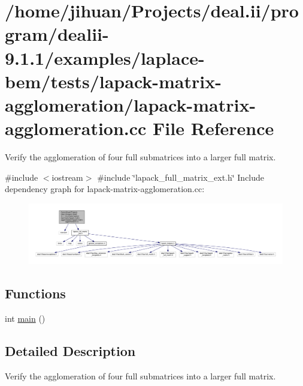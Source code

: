 \hypertarget{lapack-matrix-agglomeration_8cc}{}\section{/home/jihuan/\+Projects/deal.ii/program/dealii-\/9.1.1/examples/laplace-\/bem/tests/lapack-\/matrix-\/agglomeration/lapack-\/matrix-\/agglomeration.cc File Reference}
\label{lapack-matrix-agglomeration_8cc}


Verify the agglomeration of four full submatrices into a larger full matrix.  


{\ttfamily \#include $<$iostream$>$}\newline
{\ttfamily \#include \char`\"{}lapack\+\_\+full\+\_\+matrix\+\_\+ext.\+h\char`\"{}}\newline
Include dependency graph for lapack-\/matrix-\/agglomeration.cc\+:\nopagebreak
\begin{figure}[H]
\begin{center}
\leavevmode
\includegraphics[width=350pt]{lapack-matrix-agglomeration_8cc__incl}
\end{center}
\end{figure}
\subsection*{Functions}
\begin{DoxyCompactItemize}
\item 
int \hyperlink{lapack-matrix-agglomeration_8cc_ae66f6b31b5ad750f1fe042a706a4e3d4}{main} ()
\end{DoxyCompactItemize}


\subsection{Detailed Description}
Verify the agglomeration of four full submatrices into a larger full matrix. 

